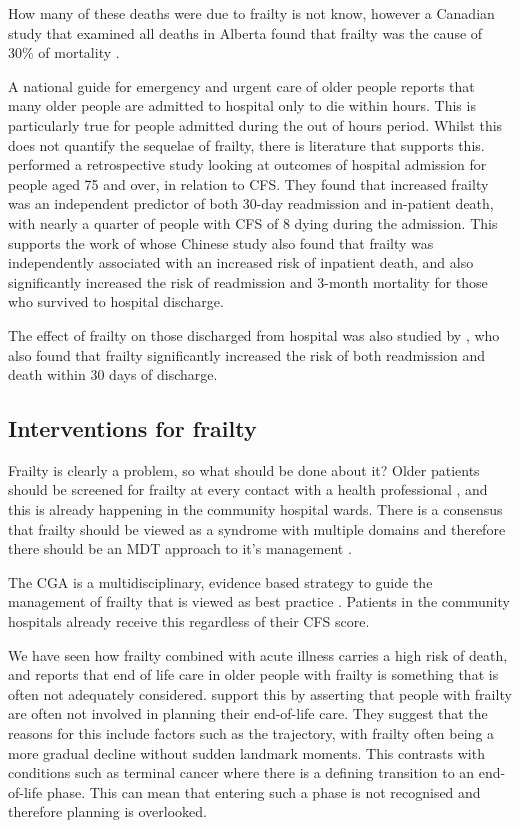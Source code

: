 \documentclass
[
	12pt,
	a4paper,
	oneside,
]{article}
\begin{document}
How many of these deaths were due to frailty is not know, however 
a Canadian study that examined all deaths in Alberta found that frailty was the
cause of 30\% of mortality \parencite{fassbender:09}.

A national guide for emergency and urgent care of older people \parencite{silver:12}
reports that many older people are admitted to hospital only to die within hours.
This is particularly true for people admitted during the out of hours period.
Whilst this does not quantify the sequelae of frailty, there is literature that 
supports this. \textcite{wallis:15} performed a retrospective study looking 
at outcomes of hospital admission for people aged 75 and over, in relation to CFS. 
They found that increased frailty was an independent predictor of both 30-day
readmission and in-patient death, with nearly a quarter of people with CFS of 8 dying 
during the admission. This supports the work of \textcite{kang:15} whose Chinese 
study also found that frailty was independently associated with an increased risk of 
inpatient death, and also significantly increased the risk of readmission and 
3-month mortality for those who survived to hospital discharge.

The effect of frailty on those discharged from hospital was also studied by 
\parencite{kahlon:15}, who also found that frailty significantly increased the 
risk of both readmission and death within 30 days of discharge.

\subsection{Interventions for frailty}
Frailty is clearly a problem, so what should be done about it? Older patients 
should be screened for frailty at every contact with a health professional 
\parencite{bgs:14}, and 
this is already happening in the community hospital wards. There is a consensus that 
frailty should be viewed as a syndrome with multiple domains and therefore
there should be an MDT approach to it's management \parencite{vellas:16}.

The CGA is a multidisciplinary, evidence based strategy to guide the management 
of frailty that is viewed as best practice \parencite{silver:12, bgs:14, oliver:14}. Patients
in the community hospitals already receive this regardless of their CFS score.

We have seen how frailty combined with acute illness carries a high risk of death, and 
\textcite{silver:12} reports that end of life care in older people with frailty
is something that is often not adequately considered. \textcite{oliver:14} support this
by asserting that people with frailty are often not involved in planning their 
end-of-life care. They suggest that the reasons for this include factors such as
the trajectory, with frailty often being a more gradual decline without sudden 
landmark moments. This contrasts with conditions such as terminal cancer where there 
is a defining transition to an end-of-life phase. This can mean that entering such a
phase is not recognised and therefore planning is overlooked. 
\end{document}

